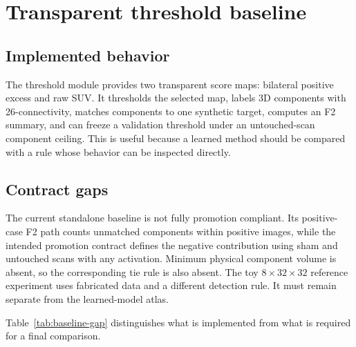 \documentclass[11pt]{article}
\begin{document}
\section{Transparent threshold baseline}

\subsection{Implemented behavior}

The threshold module provides two transparent score maps: bilateral positive excess and raw SUV. It thresholds the selected map, labels 3D components with 26-connectivity, matches components to one synthetic target, computes an F2 summary, and can freeze a validation threshold under an untouched-scan component ceiling. This is useful because a learned method should be compared with a rule whose behavior can be inspected directly.

\subsection{Contract gaps}

The current standalone baseline is not fully promotion compliant. Its positive-case F2 path counts unmatched components within positive images, while the intended promotion contract defines the negative contribution using sham and untouched scans with any activation. Minimum physical component volume is absent, so the corresponding tie rule is also absent. The toy $8 \times 32 \times 32$ reference experiment uses fabricated data and a different detection rule. It must remain separate from the learned-model atlas.

Table~\ref{tab:baseline-gap} distinguishes what is implemented from what is required for a final comparison.
\end{document}
